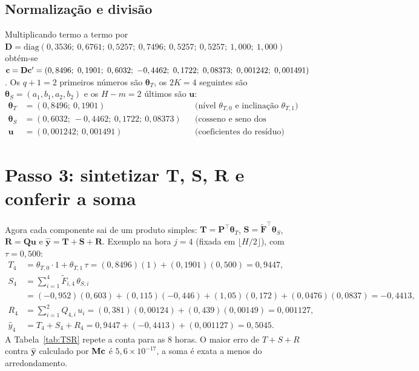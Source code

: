 \documentclass[11pt,a4paper]{article}
\newcommand{\bP}{\mathbf{P}}\newcommand{\bF}{\mathbf{F}}\newcommand{\bFt}{\widetilde{\mathbf{F}}}\newcommand{\bQ}{\mathbf{Q}}
\newcommand{\bM}{\mathbf{M}}\newcommand{\bD}{\mathbf{D}}\newcommand{\bT}{\mathbf{T}}\newcommand{\bS}{\mathbf{S}}
\newcommand{\bR}{\mathbf{R}}\newcommand{\byh}{\hat{\mathbf{y}}}\newcommand{\bX}{\mathbf{X}}
\newcommand{\thT}{\boldsymbol{\theta}_T}\newcommand{\thS}{\boldsymbol{\theta}_S}\newcommand{\bu}{\mathbf{u}}
\begin{document}
\subsection*{Normalização e divisão}
Multiplicando termo a termo por $\bD=\mathrm{diag}(0,3536;\allowbreak\ 0,6761;\allowbreak\ 0,5257;\allowbreak\ 0,7496;\allowbreak\ 0,5257;\allowbreak\ 0,5257;\allowbreak\ 1,000;\allowbreak\ 1,000)$ obtém-se $\bc=\bD\bc'=(0,8496;\allowbreak\ 0,1901;\allowbreak\ 0,6032;\allowbreak\ -0,4462;\allowbreak\ 0,1722;\allowbreak\ 0,08373;\allowbreak\ 0,001242;\allowbreak\ 0,001491)$. Os $q+1=2$ primeiros números são $\thT$, os $2K=4$ seguintes são $\thS=(a_1,b_1,a_2,b_2)$ e os $H-m=2$ últimos são $\bu$:
\begin{align*}
\thT&=(0,8496;\allowbreak\ 0,1901) &&\text{(nível $\theta_{T,0}$ e inclinação $\theta_{T,1}$)}\\
\thS&=(0,6032;\allowbreak\ -0,4462;\allowbreak\ 0,1722;\allowbreak\ 0,08373) &&\text{(cosseno e seno dos harmônicos 1 e 2)}\\
\bu&=(0,001242;\allowbreak\ 0,001491) &&\text{(coeficientes do resíduo)}
\end{align*}

\section{Passo 3: sintetizar $\bT$, $\bS$, $\bR$ e conferir a soma}\label{sec:TSR}

Agora cada componente sai de um produto simples: $\bT=\bP^\top\thT$, $\bS=\bFt^\top\thS$, $\bR=\bQ\bu$ e $\byh=\bT+\bS+\bR$. Exemplo na hora $j=4$ (fixada em $\lfloor H/2\rfloor$), com $\tau=0,500$:
\begin{align*}
T_{4}&=\theta_{T,0}\cdot 1+\theta_{T,1}\,\tau=(0,8496)(1)+(0,1901)(0,500)=0,9447,\\
S_{4}&=\sum_{i=1}^{4}\widetilde F_{i,4}\,\theta_{S,i}\\
&=(-0,952)(0,603) + (0,115)(-0,446) + (1,05)(0,172) + (0,0476)(0,0837)=-0,4413,\\
R_{4}&=\sum_{i=1}^{2}Q_{4,i}\,u_i=(0,381)(0,00124)+(0,439)(0,00149)=0,001127,\\
\hat y_{4}&=T_{4}+S_{4}+R_{4}=0,9447+(-0,4413)+(0,001127)=0,5045.
\end{align*}
A Tabela~\ref{tab:TSR} repete a conta para as $8$ horas. O maior erro de $T+S+R$ contra $\byh$ calculado por $\bM\bc$ é $5,6\times 10^{-17}$, a soma é exata a menos do arredondamento.
\end{document}
